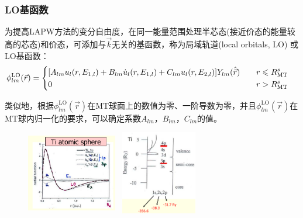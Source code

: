 \documentclass[cjk,slidestop,compress,mathserif,blue]{beamer}
\begin{document}
\frame
{
\frametitle{\textrm{LO}基函数}
为提高\textrm{LAPW}方法的变分自由度，在同一能量范围处理半芯态(接近价态的能量较高的芯态)和价态，可添加与$\vec k$无关的基函数，称为局域轨道(\textrm{local orbitals, LO})%
或\textrm{LO}基函数：
{
{\fontsize{8.5pt}{4.5pt}\selectfont
$$\hskip -10pt \phi_{lm}^{\mathrm{LO}}(\vec r)=\left\{
  \begin{aligned}
    &[A_{lm}u_l(r,E_{1,l})+B_{lm}\dot u_l(r,E_{1,l})+C_{lm}u_l(r,E_{2,l})]Y_{lm}(\hat{\vec r})\quad&r\leqslant R_{\mathrm{MT}}^s\\
    &0 &r>R_{\mathrm{MT}}^s
\end{aligned}
\right.$$}}

类似地，根据$\phi_{lm}^{\mathrm{LO}}(\vec r)$在\textrm{MT}球面上的数值为零、一阶导数为零，并且$\phi_{lm}^{\mathrm{LO}}(\vec r)$在\textrm{MT}球内归一化的要求，可以确定系数$A_{lm}$，$B_{lm}$，$C_{lm}$的值。
\begin{figure}[h!]
	\vspace{-15pt}
\centering
\hspace{15pt}
\includegraphics[height=1.45in,width=1.55in,viewport=50 10 470 415,clip]{Figures/WIEN2k-lo.png}
\includegraphics[height=1.45in,width=1.45in,viewport=5 1 570 570,clip]{Figures/semi-core.png}
\caption{\tiny \textrm{}}%
\label{Muffin_tin_LO}
\end{figure}
}
\end{document}
